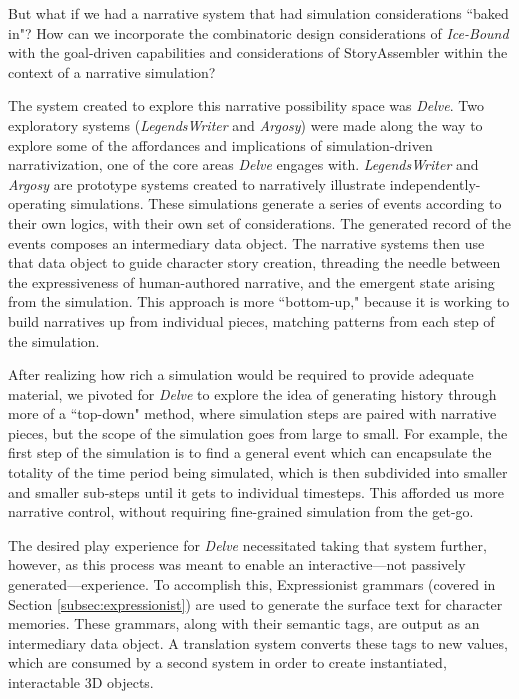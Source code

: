 But what if we had a narrative system that had simulation considerations ``baked in"? How can we incorporate the combinatoric design considerations of \textit{Ice-Bound} with the goal-driven capabilities and considerations of StoryAssembler within the context of a narrative simulation?

The system created to explore this narrative possibility space was \textit{Delve}. Two exploratory systems (\textit{LegendsWriter} and \textit{Argosy}) were made along the way to explore some of the affordances and implications of simulation-driven narrativization, one of the core areas \textit{Delve} engages with. \textit{LegendsWriter} and \textit{Argosy} are prototype systems created to narratively illustrate independently-operating simulations. These simulations generate a series of events according to their own logics, with their own set of considerations. The generated record of the events composes an intermediary data object. The narrative systems then use that data object to guide character story creation, threading the needle between the expressiveness of human-authored narrative, and the emergent state arising from the simulation. This approach is more ``bottom-up," because it is working to build narratives up from individual pieces, matching patterns from each step of the simulation.

After realizing how rich a simulation would be required to provide adequate material, we pivoted for \textit{Delve} to explore the idea of generating history through more of a ``top-down" method, where simulation steps are paired with narrative pieces, but the scope of the simulation goes from large to small. For example, the first step of the simulation is to find a general event which can encapsulate the totality of the time period being simulated, which is then subdivided into smaller and smaller sub-steps until it gets to individual timesteps. This afforded us more narrative control, without requiring fine-grained simulation from the get-go.

The desired play experience for \textit{Delve} necessitated taking that system further, however, as this process was meant to enable an interactive---not passively generated---experience. To accomplish this, Expressionist grammars \cite{ryan2016expressionist} (covered in Section \ref{subsec:expressionist}) are used to generate the surface text for character memories. These grammars, along with their semantic tags, are output as an intermediary data object. A translation system converts these tags to new values, which are consumed by a second system in order to create instantiated, interactable 3D objects. 

